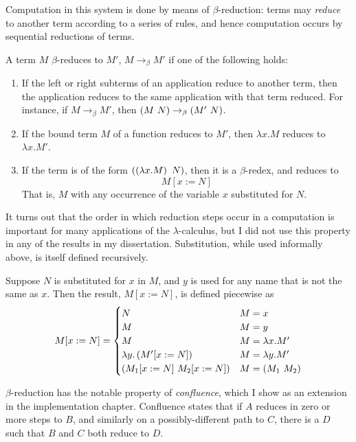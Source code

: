 Computation in this system is done by means of \(\beta\)-reduction: terms may \emph{reduce} to another term according to a series of rules, and hence computation occurs by sequential reductions of terms.

\begin{definition}
A term \(M\) \(\beta\)-reduces to \(M'\), \(M \to_\beta M'\) if one of the following holds:
\begin{enumerate}
\item
If the left or right subterms of an application reduce to another term, then the application reduces to the same application with that term reduced.
For instance, if \(M \to_\beta M'\), then \(\wrap{M\ N} \to_\beta \wrap{M'\ N}\).
\item
If the bound term \(M\) of a function reduces to \(M'\), then \(\lambda x.M\) reduces to \(\lambda x.M'\).
\item
If the term is of the form \(\left(\left(\lambda x.M\right)\ N\right)\), then it is a \(\beta\)-redex, and reduces to
\[
M[x := N]
\]
That is, \(M\) with any occurrence of the variable \(x\) substituted for \(N\).
\end{enumerate}
\end{definition}

It turns out that the order in which reduction steps occur in a computation is important for many applications of the \(\lambda\)-calculus, but I did not use this property in any of the results in my dissertation.
Substitution, while used informally above, is itself defined recursively.

\begin{definition}
Suppose \(N\) is substituted for \(x\) in \(M\), and \(y\) is used for any name that is not the same as \(x\).
Then the result, \(M[x := N]\), is defined piecewise as
\[
M[x := N] =
\begin{cases}
N & M = x\\
M & M = y\\
M & M = \lambda x. M'\\
\lambda y. \left(M'[x := N]\right) & M = \lambda y. M'\\
\left(M_1[x := N]\  M_2[x := N]\right) & M = \left(M_1\ M_2\right)\\
\end{cases}
\]
\end{definition}

\(\beta\)-reduction has the notable property of \emph{confluence}, which I show as an extension in the implementation chapter.
Confluence states that if \(A\) reduces in zero or more steps to \(B\), and similarly on a possibly-different path to \(C\), there is a \(D\) such that \(B\) and \(C\) both reduce to \(D\).

